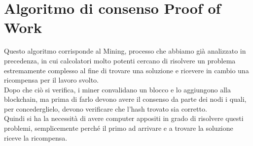 \documentclass[a4paper,11pt]{report}
\begin{document}
\section{Algoritmo di consenso Proof of Work}
Questo algoritmo corrisponde al Mining, processo che abbiamo già analizzato in precedenza, in cui calcolatori molto potenti cercano di risolvere un problema estremamente complesso al fine di trovare una soluzione e ricevere in cambio una ricompensa per il lavoro svolto.\\
Dopo che ciò si verifica, i miner convalidano un blocco e lo aggiungono alla blockchain, ma prima di farlo devono avere il consenso da parte dei nodi i quali, per concederglielo, devono verificare che l'hash trovato sia corretto.\\
Quindi si ha la necessità di avere computer appositi in grado di risolvere questi problemi, semplicemente perché il primo ad arrivare e a trovare la soluzione riceve la ricompensa. 
\end{document}
